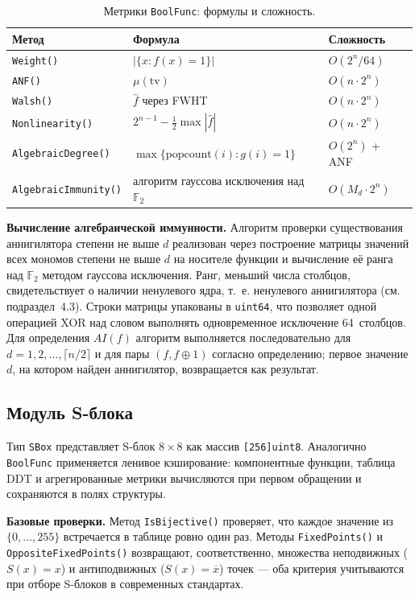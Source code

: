 \begin{table}[h]
\centering
\caption{Метрики \texttt{BoolFunc}: формулы и сложность.}
\label{tab:boolfunc-metrics}
\begin{tabular}{lll}
\hline
Метод & Формула & Сложность \\
\hline
\texttt{Weight()}           & $|\{x : f(x) = 1\}|$            & $O(2^n / 64)$ \\
\texttt{ANF()}              & $\mu(\mathrm{tv})$              & $O(n \cdot 2^n)$ \\
\texttt{Walsh()}            & $\widehat{f}$ через FWHT        & $O(n \cdot 2^n)$ \\
\texttt{Nonlinearity()}     & $2^{n-1} - \tfrac{1}{2}\max|\widehat{f}|$ & $O(n \cdot 2^n)$ \\
\texttt{AlgebraicDegree()}  & $\max\{\mathrm{popcount}(i) : g(i) = 1\}$ & $O(2^n)$ + ANF \\
\texttt{AlgebraicImmunity()}& алгоритм гауссова исключения над $\mathbb{F}_2$ & $O(M_d \cdot 2^n)$ \\
\hline
\end{tabular}
\end{table}

\textbf{Вычисление алгебраической иммунности.} Алгоритм проверки
существования аннигилятора степени не выше $d$ реализован
через построение матрицы значений всех мономов степени не выше
$d$ на носителе функции и вычисление её ранга над $\mathbb{F}_2$
методом гауссова исключения. Ранг, меньший числа столбцов,
свидетельствует о наличии ненулевого ядра, т.~е. ненулевого
аннигилятора (см. подраздел~4.3). Строки матрицы упакованы в
\texttt{uint64}, что позволяет одной операцией XOR над словом
выполнять одновременное исключение 64~столбцов. Для определения
$AI(f)$ алгоритм выполняется последовательно для $d = 1, 2, \dots,
\lceil n/2 \rceil$ и для пары $(f, f \oplus 1)$ согласно
определению; первое значение $d$, на котором найден аннигилятор,
возвращается как результат.

\subsection{Модуль S-блока}

Тип \texttt{SBox} представляет S-блок $8 \times 8$ как массив
\texttt{[256]uint8}. Аналогично \texttt{BoolFunc} применяется ленивое
кэширование: компонентные функции, таблица DDT и агрегированные
метрики вычисляются при первом обращении и сохраняются в полях
структуры.

\textbf{Базовые проверки.} Метод \texttt{IsBijective()} проверяет,
что каждое значение из $\{0, \dots, 255\}$ встречается в таблице
ровно один раз. Методы \texttt{FixedPoints()} и
\texttt{OppositeFixedPoints()} возвращают, соответственно, множества
неподвижных ($S(x) = x$) и антиподвижных ($S(x) = \overline{x}$)
точек — оба критерия учитываются при отборе S-блоков в современных
стандартах.

